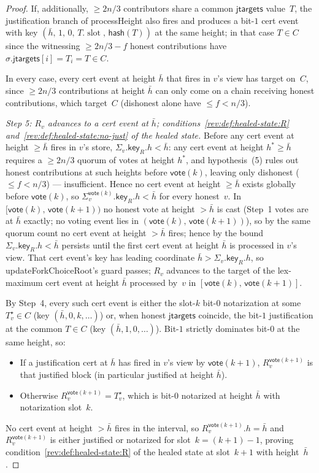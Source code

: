 \ifx\litemode\undefined\documentclass{article}\fi
\newcommand{\slot}[0]{\ensuremath{\operatorname{\mathrm{slot}}}}
\newcommand{\jtargets}{\mathsf{jtargets}}
\newcommand{\hash}{\mathsf{hash}}
\newcommand{\key}{\mathsf{key}}
\newcommand{\vote}{\mathsf{vote}}
\newcommand{\comm}[1]{\bar{#1}}
\newcommand{\processHeight}{\textsf{processHeight}\xspace}
\newcommand{\updateForkChoiceRoot}{\textsf{updateForkChoiceRoot}\xspace}
\theoremstyle{plain}
\theoremstyle{definition}
\theoremstyle{remark}
\begin{document}
\begin{proof}
If, additionally, $\geq 2n/3$ contributors share a common $\jtargets$ value~$T$, the justification branch of \processHeight{} also fires and produces a bit-$1$ cert event with key $(\comm{h},\, 1,\, 0,\, T.\slot,\, \hash(T))$ at the same height; in that case $T \in C$ since the witnessing $\geq 2n/3 - f$ honest contributions have $\sigma.\jtargets[i] = T_i = T \in C$.

In every case, every cert event at height $\comm{h}$ that fires in $v$'s view has target on~$C$, since $\geq 2n/3$ contributions at height $\comm{h}$ can only come on a chain receiving honest contributions, which target~$C$ (dishonest alone have $\leq f < n/3$).

\emph{Step 5: $R_v$ advances to a cert event at $\comm{h}$; conditions~\ref{rev:def:healed-state:R} and~\ref{rev:def:healed-state:no-just} of the healed state.}
Before any cert event at height $\geq \comm{h}$ fires in $v$'s store, $\Sigma_v.\key_R.h < \comm{h}$: any cert event at height $h^* \geq \comm{h}$ requires a $\geq 2n/3$ quorum of votes at height $h^*$, and hypothesis~(5) rules out honest contributions at such heights before $\vote(k)$, leaving only dishonest ($\leq f < n/3$) --- insufficient. Hence no cert event at height $\geq \comm{h}$ exists globally before $\vote(k)$, so $\Sigma_v^{\vote(k)}.\key_R.h < \comm{h}$ for every honest~$v$.
In $[\vote(k),\, \vote(k+1))$ no honest vote at height $> \comm{h}$ is cast (Step~1 votes are at $\comm{h}$ exactly; no voting event lies in $(\vote(k),\, \vote(k+1))$), so by the same quorum count no cert event at height $> \comm{h}$ fires; hence by  the bound $\Sigma_v.\key_R.h < \comm{h}$ persists until the first cert event at height $\comm{h}$ is processed in $v$'s view.
That cert event's key has leading coordinate $\comm{h} > \Sigma_v.\key_R.h$, so \updateForkChoiceRoot{}'s guard passes; $R_v$ advances to the target of the lex-maximum cert event at height $\comm{h}$ processed by~$v$ in $[\vote(k),\, \vote(k+1)]$.

By Step~4, every such cert event is either the slot-$k$ bit-$0$ notarization at some $T^\star_v \in C$ (key $(\comm{h}, 0, k, \ldots)$) or, when honest $\jtargets$ coincide, the bit-$1$ justification at the common $T \in C$ (key $(\comm{h}, 1, 0, \ldots)$). Bit-$1$ strictly dominates bit-$0$ at the same height, so:
\begin{itemize}
  \item If a justification cert at $\comm{h}$ has fired in $v$'s view by $\vote(k+1)$, $R_v^{\vote(k+1)}$ is that justified block (in particular justified at height $\comm{h}$).
  \item Otherwise $R_v^{\vote(k+1)} = T^\star_v$, which is bit-$0$ notarized at height $\comm{h}$ with notarization slot~$k$.
\end{itemize}
No cert event at height $> \comm{h}$ fires in the interval, so $R_v^{\vote(k+1)}.h = \comm{h}$ and $R_v^{\vote(k+1)}$ is either justified or notarized for slot~$k = (k+1)-1$, proving condition~\ref{rev:def:healed-state:R} of the healed state at slot~$k+1$ with height~$\comm{h}$.


\end{proof}
\end{document}
